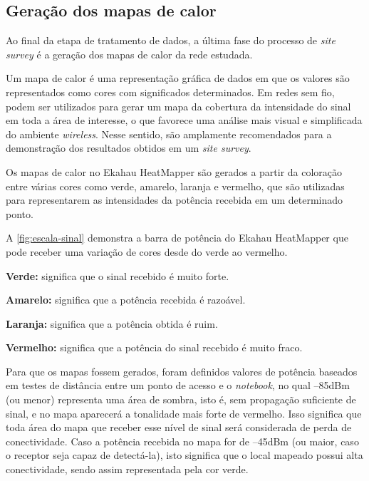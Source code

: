 \subsection{Geração dos mapas de calor}
\label{subsec:mapas-de-calor}

Ao final da etapa de tratamento de dados, a última fase do processo de \textit{site survey} é a geração dos mapas de calor da rede estudada.

Um mapa de calor é uma representação gráfica de dados em que os valores são representados como cores com significados determinados. Em redes sem fio, podem ser utilizados para gerar um mapa da cobertura da intensidade do sinal em toda a área de interesse, o que favorece uma análise mais visual e simplificada do ambiente \textit{wireless}. Nesse sentido, são amplamente recomendados para a demonstração dos resultados obtidos em um \textit{site survey}.

Os mapas de calor no Ekahau HeatMapper são gerados a partir da coloração entre várias cores como verde, amarelo, laranja e vermelho, que são utilizadas para representarem as intensidades da potência recebida em um determinado ponto.

A \autoref{fig:escala-sinal} demonstra a barra de potência do Ekahau HeatMapper que pode receber uma variação de cores desde do verde ao vermelho.

\begin{compactitem}
	\item \textbf{Verde:} significa que o sinal recebido é muito forte.
	\item \textbf{Amarelo:} significa que a potência recebida é razoável.
	\item \textbf{Laranja:} significa que a potência obtida é ruim.
	\item \textbf{Vermelho:} significa que a potência do sinal recebido é muito fraco.
\end{compactitem}

\begin{figure}[H]
	\centering
\end{figure}

Para que os mapas fossem gerados, foram definidos valores de potência baseados em testes de distância entre um ponto de acesso e o \textit{notebook}, no qual --85dBm (ou menor) representa uma área de sombra, isto é, sem propagação suficiente de sinal, e no mapa aparecerá a tonalidade mais forte de vermelho. Isso significa que toda área do mapa que receber esse nível de sinal será considerada de perda de conectividade. Caso a potência recebida no mapa for de --45dBm (ou maior, caso o receptor seja capaz de detectá-la), isto significa que o local mapeado possui alta conectividade, sendo assim representada pela cor verde.

